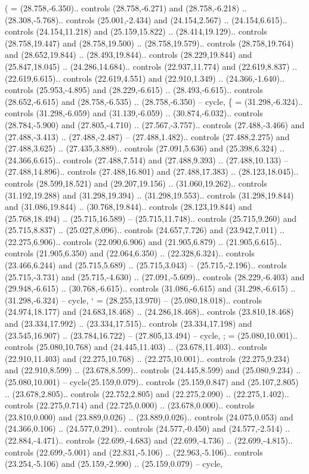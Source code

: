 {(} = {(28.758,-6.350).. controls (28.758,-6.271) and (28.758,-6.218) .. (28.308,-5.768).. controls (25.001,-2.434) and (24.154,2.567) .. (24.154,6.615).. controls (24.154,11.218) and (25.159,15.822) .. (28.414,19.129).. controls (28.758,19.447) and (28.758,19.500) .. (28.758,19.579).. controls (28.758,19.764) and (28.652,19.844) .. (28.493,19.844).. controls (28.229,19.844) and (25.847,18.045) .. (24.286,14.684).. controls (22.937,11.774) and (22.619,8.837) .. (22.619,6.615).. controls (22.619,4.551) and (22.910,1.349) .. (24.366,-1.640).. controls (25.953,-4.895) and (28.229,-6.615) .. (28.493,-6.615).. controls (28.652,-6.615) and (28.758,-6.535) .. (28.758,-6.350) -- cycle},
{\{} = {(31.298,-6.324).. controls (31.298,-6.059) and (31.139,-6.059) .. (30.874,-6.032).. controls (28.784,-5.900) and (27.805,-4.710) .. (27.567,-3.757).. controls (27.488,-3.466) and (27.488,-3.413) .. (27.488,-2.487) -- (27.488,1.482).. controls (27.488,2.275) and (27.488,3.625) .. (27.435,3.889).. controls (27.091,5.636) and (25.398,6.324) .. (24.366,6.615).. controls (27.488,7.514) and (27.488,9.393) .. (27.488,10.133) -- (27.488,14.896).. controls (27.488,16.801) and (27.488,17.383) .. (28.123,18.045).. controls (28.599,18.521) and (29.207,19.156) .. (31.060,19.262).. controls (31.192,19.288) and (31.298,19.394) .. (31.298,19.553).. controls (31.298,19.844) and (31.086,19.844) .. (30.768,19.844).. controls (28.123,19.844) and (25.768,18.494) .. (25.715,16.589) -- (25.715,11.748).. controls (25.715,9.260) and (25.715,8.837) .. (25.027,8.096).. controls (24.657,7.726) and (23.942,7.011) .. (22.275,6.906).. controls (22.090,6.906) and (21.905,6.879) .. (21.905,6.615).. controls (21.905,6.350) and (22.064,6.350) .. (22.328,6.324).. controls (23.466,6.244) and (25.715,5.689) .. (25.715,3.043) -- (25.715,-2.196).. controls (25.715,-3.731) and (25.715,-4.630) .. (27.091,-5.609).. controls (28.229,-6.403) and (29.948,-6.615) .. (30.768,-6.615).. controls (31.086,-6.615) and (31.298,-6.615) .. (31.298,-6.324) -- cycle},
{`} = {(28.255,13.970) -- (25.080,18.018).. controls (24.974,18.177) and (24.683,18.468) .. (24.286,18.468).. controls (23.810,18.468) and (23.334,17.992) .. (23.334,17.515).. controls (23.334,17.198) and (23.545,16.907) .. (23.784,16.722) -- (27.805,13.494) -- cycle},
{;} = {(25.080,10.001).. controls (25.080,10.768) and (24.445,11.403) .. (23.678,11.403).. controls (22.910,11.403) and (22.275,10.768) .. (22.275,10.001).. controls (22.275,9.234) and (22.910,8.599) .. (23.678,8.599).. controls (24.445,8.599) and (25.080,9.234) .. (25.080,10.001) -- cycle(25.159,0.079).. controls (25.159,0.847) and (25.107,2.805) .. (23.678,2.805).. controls (22.752,2.805) and (22.275,2.090) .. (22.275,1.402).. controls (22.275,0.714) and (22.725,0.000) .. (23.678,0.000).. controls (23.810,0.000) and (23.889,0.026) .. (23.889,0.026).. controls (24.075,0.053) and (24.366,0.106) .. (24.577,0.291).. controls (24.577,-0.450) and (24.577,-2.514) .. (22.884,-4.471).. controls (22.699,-4.683) and (22.699,-4.736) .. (22.699,-4.815).. controls (22.699,-5.001) and (22.831,-5.106) .. (22.963,-5.106).. controls (23.254,-5.106) and (25.159,-2.990) .. (25.159,0.079) -- cycle},
